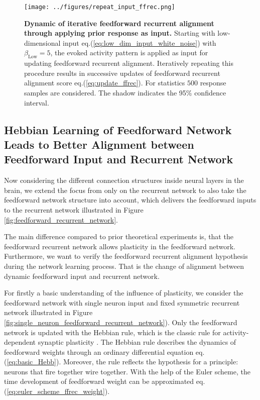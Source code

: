 \documentclass[11pt]{article}
\begin{document}
	\begin{SCfigure}[0.9][t!]
		\centering
		\caption[Dynamic of iterative feedforward recurrent alignment through applying prior response as input]{\textbf{Dynamic of iterative feedforward recurrent alignment through applying prior response as input.} Starting with low-dimensional input eq.(\ref{eq:low_dim_input_white_noise}) with $\beta_{\text{Low}} = 5$, the evoked activity pattern is applied as input for updating feedforward recurrent alignment. Iteratively repeating this procedure results in successive updates of feedforward recurrent alignment score eq.(\ref{eq:update_ffrec}). For statistics $500$ response samples are considered. The shadow indicates the 95\% confidence interval.}
		\texttt{[image: ../figures/repeat\_input\_ffrec.png]}
		\label{fig:ffrec_repeat_input}
	\end{SCfigure}
	\null
	\vfill
	
	\clearpage
	\subsection{Hebbian Learning of Feedforward Network Leads to Better Alignment between Feedforward Input and Recurrent Network} \label{sec:Habb_result}
	
	Now considering the different connection structures inside neural layers in the brain, we extend the focus from only on the recurrent network to also take the feedforward network structure into account, which delivers the feedforward inputs to the  recurrent network illustrated in Figure \ref{fig:feedforward_recurrent_network}. 
	
	The main difference compared to prior theoretical experiments is, that the feedforward recurrent network allows plasticity in the feedforward network. Furthermore, we want to verify the feedforward recurrent alignment hypothesis during the network learning process. That is the change of alignment between dynamic feedforward input and recurrent network. 
	
	For firstly a basic understanding of the influence of plasticity, we consider the feedforward network with single neuron input and fixed symmetric recurrent network illustrated in Figure \ref{fig:single_neuron_feedforward_recurrent_network}). Only the feedforward network is updated with the Hebbian rule, which is the classic rule for activity-dependent synaptic plasticity \cite{dayan2005theoretical}. The Hebbian rule describes the dynamics of feedforward weights through an ordinary differential equation eq.(\ref{eq:basic_Hebb}). Moreover, the rule reflects the hypothesis for a principle: neurons that fire together wire together. With the help of the Euler scheme, the time development of feedforward weight can be approximated eq.(\ref{eq:euler_scheme_ffrec_weight}). 
	
\end{document}
